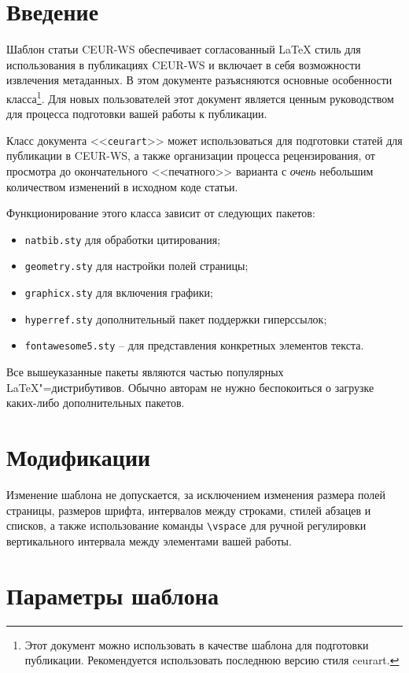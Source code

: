 \documentclass[
12pt,
polyglossia,   %
wordmath,      %
]{isdctart}
\begin{document}
\section{Введение}

Шаблон статьи CEUR-WS обеспечивает согласованный \LaTeX{} стиль для использования в публикациях CEUR-WS и включает в себя возможности извлечения метаданных. В этом документе разъясняются основные особенности класса\footnote{Этот документ можно использовать в качестве шаблона для подготовки публикации. Рекомендуется использовать последнюю версию стиля ceurart.}. Для новых пользователей этот документ является ценным руководством для процесса подготовки вашей работы к публикации.

Класс документа <<\verb|ceurart|>> может использоваться для подготовки статей для публикации в CEUR-WS, а также организации процесса рецензирования, от просмотра до окончательного <<печатного>> варианта с {\itshape очень} небольшим количеством изменений в исходном коде статьи.

Функционирование этого класса зависит от следующих пакетов:

\begin{itemize}
\item \verb|natbib.sty| для обработки цитирования;
\item \verb|geometry.sty| для настройки полей страницы;
\item \verb|graphicx.sty| для включения графики;
\item \verb|hyperref.sty| дополнительный пакет поддержки гиперссылок;
\item \verb|fontawesome5.sty| -- для представления конкретных элементов текста.
\end{itemize}

Все вышеуказанные пакеты являются частью популярных \LaTeX{}"=дистрибутивов. Обычно авторам не нужно беспокоиться о загрузке каких-либо дополнительных пакетов.

\section{Модификации}

Изменение шаблона не допускается, за исключением изменения размера полей страницы, размеров шрифта, интервалов между строками, стилей абзацев и списков, а также использование команды \verb|\vspace| для ручной регулировки вертикального интервала между элементами вашей работы.

\section{Параметры шаблона}
\end{document}

